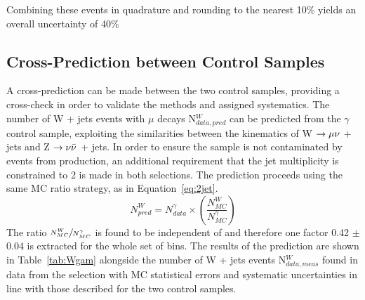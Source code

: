 Combining these events in quadrature and rounding to the nearest 10\% yields an overall uncertainty of 40\%
\subsection{Cross-Prediction between Control Samples}
A cross-prediction can be made between the two control samples, providing a cross-check in order to validate the methods and assigned systematics. The number of W + jets events with $\mu$ decays N$^{W}_{data, pred}$ can be predicted from the $\gamma$ control sample, exploiting the similarities between the kinematics of W $\rightarrow \mu \nu$ + jets and Z $\rightarrow \nu \bar{\nu}$ + jets. In order to ensure the sample is not contaminated by events from \tto production, an additional requirement that the jet multiplicity is constrained to 2 is made in both selections. The prediction proceeds using the same MC ratio strategy, as in Equation~\ref{eq:2jet}.
\begin{equation}
N^{W}_{pred} = N^{\gamma}_{data} \times (\frac{N^{W}_{MC}}{N^{\gamma}_{MC}})
\label{eq:2jet}
\end{equation} 
The ratio $\sfrac{N^{W}_{MC}}{N^{\gamma}_{MC}}$ is found to be independent of \HT and therefore one factor 0.42 $\pm$ 0.04 is extracted for the whole set of bins. The results of the prediction are shown in Table~\ref{tab:Wgam} alongside the number of W + jets events N$^{W}_{data, meas}$ found in data from the selection with MC statistical errors and systematic uncertainties in line with those described for the two control samples. 

